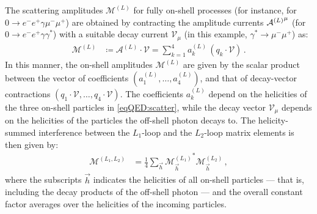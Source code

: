 \documentclass[main.tex]{subfiles}
\begin{document}
The scattering amplitudes $\mathcal{M}^{(L)}$ for fully on-shell processes (for instance, for $0 \to e^-e^+ \gamma \mu^-\mu^+$) are obtained by contracting the amplitude currents ${\mathcal{A}^{(L)}}^{\mu}$ (for $0 \to e^-e^+ \gamma \gamma^*$) with a suitable decay current $\mathcal{V}_\mu$ (in this example, $\gamma^*\to\mu^-\mu^+$) as:
\begin{align}
    \label{eqQED:on-shell-amps}
    \mathcal{M}^{(L)} &\coloneqq \mathcal{A}^{(L)} \cdot\mathcal{V}  = \sum_{k=1}^4 a_k^{(L)} \, \left( q_k\cdot\mathcal{V} \right) \,.
\end{align}
In this manner, the on-shell amplitudes $\mathcal{M}^{(L)}$ are given by the scalar product between the vector of coefficients $(a_1^{(L)}, \ldots, a_4^{(L)})$, and that of decay-vector contractions ${(q_1\cdot\mathcal{V}, \ldots, q_4\cdot\mathcal{V} )}$.
The coefficients $a^{(L)}_k$ depend on the helicities of the three on-shell particles in \cref{eqQED:scatter}, while the decay vector $\mathcal{V}_{\mu}$ depends on the helicities of the particles the off-shell photon decays to. The helicity-summed interference between the $L_1$-loop and the $L_2$-loop matrix elements is then given by:
\begin{align} \label{eqQED:squared_M}
    \mathcal{M}^{(L_1,L_2)} &= \frac{1}{4} \sum_{\vec{h}} {\mathcal{M}^{(L_1)}_{\vec{h}}}^* \mathcal{M}^{(L_2)}_{\vec{h}} \,,
\end{align}
where the subscripts $\vec{h}$ indicates the helicities of all on-shell particles --- that is, including the decay products of the off-shell photon --- and the overall constant factor averages over the helicities of the incoming particles.
\end{document}
